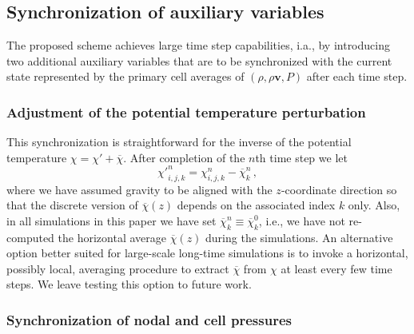 \documentclass[12pt,a4paper]{article}
\theoremstyle{definition}
\newcommand{\vect}[1]{{\mathbf{#1}}}
\newcommand{\vv}{\vect{v}}
\newcommand{\chibar}{\overline{\chi}}
\newcommand{\chiprime}{{\chi'}}
\begin{document}

\subsection{Synchronization of auxiliary variables}
\label{ssec:Synchronization}

The proposed scheme achieves large time step capabilities, i.a., by introducing
two additional auxiliary variables that are to be synchronized with the current
state represented by the primary cell averages of $(\rho, \rho\vv, P)$ after 
each time step. 


\subsubsection{Adjustment of the potential temperature perturbation}
\label{ssec:PotTempAdj}

This synchronization is straightforward for the inverse of the potential temperature 
$\chi = \chiprime + \chibar$. After completion of the $n$th time step we let
%
\begin{equation}
\chiprime_{i,j,k}^{n} = \chi_{i,j,k}^{n} - \chibar_{k}^{n}\,,
\end{equation}   
%
where we have assumed gravity to be aligned with the $z$-coordinate
direction so that the discrete version of $\chibar(z)$ depends on the 
associated index $k$ only. Also, in all simulations in this paper we have 
set $\chibar_k^{n} \equiv \chibar_k^{0}$, i.e., we have not re-computed
the horizontal average $\chibar(z)$ during the simulations.
An alternative option better suited for large-scale long-time simulations 
is to invoke a horizontal, possibly local, averaging procedure to extract 
$\chibar$ from $\chi$ at least every few time steps. We leave testing 
this option to future work.	 


\subsubsection{Synchronization of nodal and cell pressures}
\label{ssec:SynchronizationChi}
\end{document}
